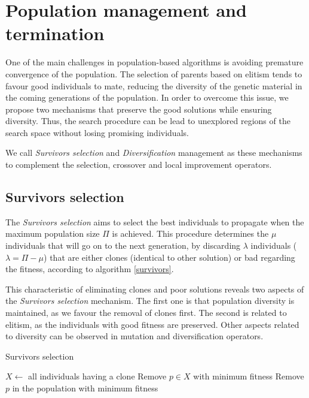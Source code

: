 \section{Population management and termination}
One of the main challenges in population-based algorithms is avoiding premature convergence of the population. The selection of parents based on elitism tends to favour good individuals to mate, reducing the diversity of the genetic material in the coming generations of the population. In order to overcome this issue, we propose two mechanisms that preserve the good solutions while ensuring diversity. Thus, the search procedure can be lead to unexplored regions of the search space without losing promising individuals.

We call \textit{Survivors selection} and \textit{Diversification} management as these mechanisms to complement the selection, crossover and local improvement operators.

\subsection{Survivors selection}
The \textit{Survivors selection} aims to select the best individuals to propagate when the maximum population size $\Pi$ is achieved. This procedure determines the $\mu$ individuals that will go on to the next generation, by discarding $\lambda$ individuals ($\lambda = \Pi - \mu$) that are either clones (identical to other solution) or bad regarding the fitness, according to algorithm \ref{survivors}.

This characteristic of eliminating clones and poor solutions reveals two aspects of the \textit{Survivors selection} mechanism. The first one is that population diversity is maintained, as we favour the removal of clones first. The second is related to elitism, as the individuals with good fitness are preserved. Other aspects related to diversity can be observed in mutation and diversification operators.

\begin{algorithm}[H]
\caption{Survivors selection}
\label{survivors}
\begin{algorithmic}[1]
\STATE $X \leftarrow $ all individuals having a clone
\STATE Remove $p \in X$ with minimum fitness
\ELSE
\STATE Remove $p$ in the population with minimum fitness
\ENDIF
\ENDFOR
\end{algorithmic}
\end{algorithm}

